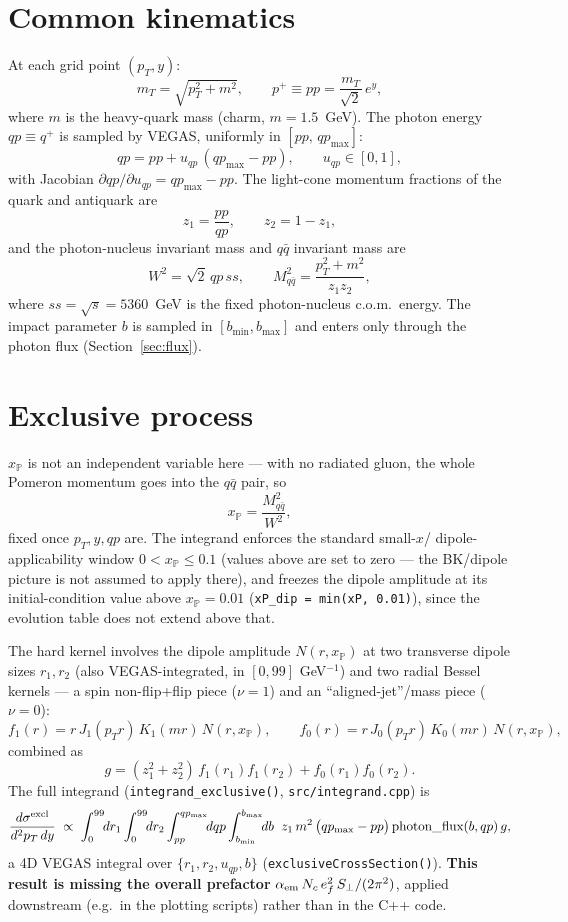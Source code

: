 \documentclass[11pt]{article}
\begin{document}
\section{Common kinematics}

At each grid point $(p_T,y)$:
\[
m_T = \sqrt{p_T^2+m^2}, \qquad p^+ \equiv pp = \frac{m_T}{\sqrt2}\,e^{y},
\]
where $m$ is the heavy-quark mass (charm, $m=1.5$~GeV). The photon energy
$qp\equiv q^+$ is sampled by VEGAS, uniformly in $[pp,\,qp_{\max}]$:
\[
qp = pp + u_{qp}\,(qp_{\max}-pp), \qquad u_{qp}\in[0,1],
\]
with Jacobian $\partial qp/\partial u_{qp} = qp_{\max}-pp$. The light-cone
momentum fractions of the quark and antiquark are
\[
z_1 = \frac{pp}{qp}, \qquad z_2 = 1-z_1,
\]
and the photon-nucleus invariant mass and $q\bar q$ invariant mass are
\[
W^2 = \sqrt2\,qp\,ss, \qquad M_{q\bar q}^2 = \frac{p_T^2+m^2}{z_1 z_2},
\]
where $ss=\sqrt{s}=5360$~GeV is the fixed photon-nucleus c.o.m.\ energy.
The impact parameter $b$ is sampled in $[b_{\min},b_{\max}]$ and enters
only through the photon flux (Section~\ref{sec:flux}).

\section{Exclusive process}

$x_{\mathbb P}$ is not an independent variable here — with no radiated
gluon, the whole Pomeron momentum goes into the $q\bar q$ pair, so
\[
x_{\mathbb P} = \frac{M_{q\bar q}^2}{W^2},
\]
fixed once $p_T,y,qp$ are. The integrand enforces the standard small-$x$/
dipole-applicability window $0<x_{\mathbb P}\le0.1$ (values above are set
to zero — the BK/dipole picture is not assumed to apply there), and freezes
the dipole amplitude at its initial-condition value above
$x_{\mathbb P}=0.01$ (\texttt{xP\_dip = min(xP, 0.01)}), since the
evolution table does not extend above that.

The hard kernel involves the dipole amplitude $N(r,x_{\mathbb P})$ at two
transverse dipole sizes $r_1,r_2$ (also VEGAS-integrated, in $[0,99]$
GeV$^{-1}$) and two radial Bessel kernels — a spin non-flip+flip piece
($\nu=1$) and an ``aligned-jet''/mass piece ($\nu=0$):
\[
f_{1}(r) = r\,J_1(p_Tr)\,K_1(mr)\,N(r,x_{\mathbb P}), \qquad
f_{0}(r) = r\,J_0(p_Tr)\,K_0(mr)\,N(r,x_{\mathbb P}),
\]
combined as
\[
g = (z_1^2+z_2^2)\,f_1(r_1)f_1(r_2) + f_0(r_1)f_0(r_2).
\]
The full integrand (\texttt{integrand\_exclusive()},
\texttt{src/integrand.cpp}) is
\[
\frac{d\sigma^{\rm excl}}{d^2p_T\,dy} \;\propto\;
\int_0^{99}\!\!dr_1\int_0^{99}\!\!dr_2\int_{pp}^{qp_{\max}}\!\!dqp
\int_{b_{\min}}^{b_{\max}}\!\!db\;\;
z_1\,m^2\,\big(qp_{\max}-pp\big)\,\text{photon\_flux}(b,qp)\,g,
\]
a 4D VEGAS integral over $\{r_1,r_2,u_{qp},b\}$
(\texttt{exclusiveCrossSection()}). \textbf{This result is missing the
overall prefactor} $\alpha_{\rm em}\,N_c\,e_f^2\,S_\perp/(2\pi^2)$, applied
downstream (e.g.\ in the plotting scripts) rather than in the C++ code.
\end{document}
